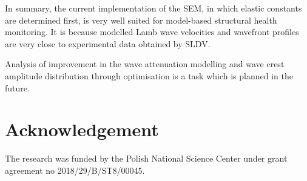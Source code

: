 \documentclass[preprint,12pt]{elsarticle}
\begin{document}
In summary, the current implementation of the SEM, in which elastic constants are determined first, is very well suited for model-based structural health monitoring. 
It is because modelled Lamb wave velocities and wavefront profiles are very close to experimental data obtained by SLDV. 

Analysis of improvement in the wave attenuation modelling and wave crest amplitude distribution through optimisation is a task which is planned in the future.

\section*{Acknowledgement}
The research was funded by the Polish National Science Center under grant agreement no 2018/29/B/ST8/00045. 
		
	
    
	{}
\end{document}
